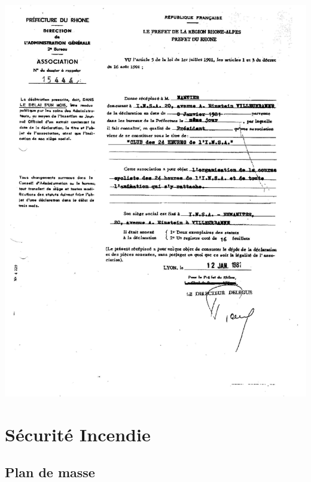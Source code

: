 \documentclass[hidelinks, paper=a4, fontsize=13pt]{report}
\begin{document}
\begin{center}
\includegraphics[scale=0.7]{Annexes/Images/decla}
\end{center}

\newpage


\chapter{ Sécurité Incendie}

\section{Plan de masse}
\end{document}
